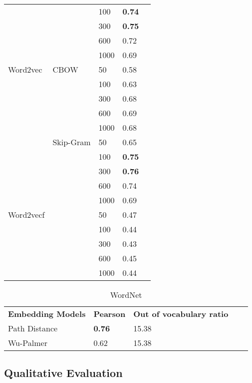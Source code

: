 \begin{table}[]
\begin{minipage}{.5\textwidth}
\begin{tabular}{@{}lllll@{}}
                 &               & 100  & \textbf{0.74}    \\
                 &               & 300  & \textbf{0.75}    \\
                 &               & 600  & 0.72             \\
                 &               & 1000 & 0.69             \\ \cmidrule(r){1-4}
Word2vec         & CBOW          & 50   & 0.58             \\
                 &               & 100  & 0.63             \\
                 &               & 300  & 0.68             \\
                 &               & 600  & 0.69             \\
                 &               & 1000 & 0.68             \\ \cmidrule(lr){2-4}
                 & Skip-Gram     & 50   & 0.65             \\
                 &               & 100  & \textbf{0.75}    \\
                 &               & 300  & \textbf{0.76}    \\
                 &               & 600  & 0.74             \\
                 &               & 1000 & 0.69             \\ \cmidrule(r){1-4}
Word2vecf        &               & 50   & 0.47             \\
                 &               & 100  & 0.44             \\
                 &               & 300  & 0.43             \\
                 &               & 600  & 0.45             \\
                 &               & 1000 & 0.44             \\ \cmidrule(r){1-4}
\end{tabular}
\end{minipage}
\end{table}



\begin{table}[]
\caption{WordNet}
\label{tab:worneteval}
\centering%
\begin{minipage}{.6\textwidth}
\begin{tabular}{@{}lllll@{}}
\cmidrule(r){1-5}
\textbf{Embedding Models} & \textbf{Pearson}          & \textbf{Out of vocabulary ratio} \\ 
\cmidrule(r){1-3}
Path Distance & \textbf{0.76}    & 15.38                   \\
Wu-Palmer     & 0.62             & 15.38                   \\ \cmidrule(r){1-3}
\end{tabular}
\end{minipage}
\end{table}

\subsection{Qualitative Evaluation}\label{chap:results:quantitative}
